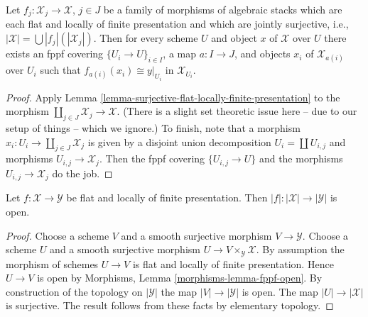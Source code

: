 \begin{lemma}
\label{lemma-surjective-family-flat-locally-finite-presentation}
Let $f_j : \mathcal{X}_j \to \mathcal{X}$, $j \in J$ be a family of morphisms
of algebraic stacks which are each flat and locally of finite presentation
and which are jointly surjective, i.e.,
$|\mathcal{X}| = \bigcup |f_j|(|\mathcal{X}_j|)$.
Then for every scheme $U$ and object $x$ of $\mathcal{X}$ over $U$
there exists an fppf covering $\{U_i \to U\}_{i \in I}$, a map
$a : I \to J$, and objects $x_i$ of $\mathcal{X}_{a(i)}$ over $U_i$
such that $f_{a(i)}(x_i) \cong y|_{U_i}$ in $\mathcal{X}_{U_i}$.
\end{lemma}

\begin{proof}
Apply
Lemma \ref{lemma-surjective-flat-locally-finite-presentation}
to the morphism $\coprod_{j \in J} \mathcal{X}_j \to \mathcal{X}$.
(There is a slight set theoretic issue here -- due to our setup of
things -- which we ignore.) To finish, note that a morphism
$x_i : U_i \to \coprod_{j \in J} \mathcal{X}_j$ is given by a
disjoint union decomposition $U_i = \coprod U_{i, j}$ and morphisms
$U_{i, j} \to \mathcal{X}_j$. Then the fppf covering $\{U_{i, j} \to U\}$
and the morphisms $U_{i, j} \to \mathcal{X}_j$ do the job.
\end{proof}

\begin{lemma}
\label{lemma-fppf-open}
Let $f : \mathcal{X} \to \mathcal{Y}$ be flat and locally of finite
presentation. Then $|f| : |\mathcal{X}| \to |\mathcal{Y}|$ is open.
\end{lemma}

\begin{proof}
Choose a scheme $V$ and a smooth surjective morphism $V \to \mathcal{Y}$.
Choose a scheme $U$ and a smooth surjective morphism
$U \to V \times_\mathcal{Y} \mathcal{X}$. By assumption the morphism
of schemes $U \to V$ is flat and locally of finite presentation.
Hence $U \to V$ is open by
Morphisms, Lemma \ref{morphisms-lemma-fppf-open}.
By construction of the topology on $|\mathcal{Y}|$ the map
$|V| \to |\mathcal{Y}|$ is open.
The map $|U| \to |\mathcal{X}|$ is surjective.
The result follows from these facts by elementary topology.
\end{proof}















